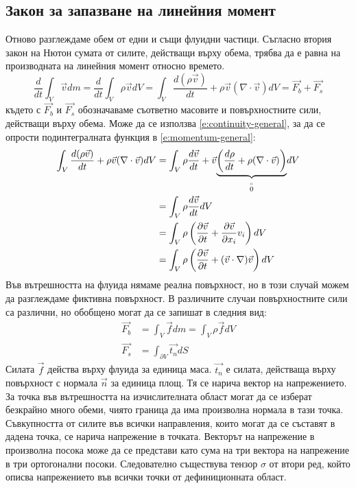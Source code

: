 \documentclass[12pt]{article}
\numberwithin{equation}{section}
\newcommand{\vel}{\vec{v}}
\newcommand{\DefineAs}[2]{\underset{\overset{\shortparallel}{#2}}{\underbrace{#1}}}
\begin{document}
\subsection{Закон за запазване на линейния момент}
Отново разглеждаме обем от едни и същи флуидни частици. Съгласно втория закон на Нютон сумата от силите, действащи върху обема, трябва да е равна на производната на линейния момент относно времето.
\begin{equation}
    \label{e:momentum-general}
    \frac{d}{dt}\int_V \vel dm=\frac{d}{dt}\int_V \rho\vel dV=\int_V \frac{d(\rho\vel)}{dt} + \rho\vel(\nabla\cdot\vel)dV=\vec{F_b}+\vec{F_s}
\end{equation}
където с $\vec{F_b}$ и $\vec{F_s}$ обозначаваме съответно масовите и повърхностните сили, действащи върху обема. Може да се използва \autoref{e:continuity-general}, за да се опрости подинтегралната функция в \autoref{e:momentum-general}:
\begin{equation}
    \begin{aligned}
        \int_V \frac{d(\rho\vel)}{dt} + \rho\vel(\nabla\cdot\vel)dV&=\int_V \rho\frac{d\vel}{dt}+\vel\DefineAs{\left(\frac{d\rho}{dt}+ \rho(\nabla\cdot\vel)\right)}{0} dV \\
        &=\int_V \rho\frac{d\vel}{dt}dV \\
        &=\int_V \rho\left(\frac{\partial \vel}{\partial t} + \frac{\partial \vel}{\partial x_i}v_i\right)dV  \\
        &=\int_V \rho\left(\frac{\partial \vel}{\partial t} + (\vel\cdot\nabla)\vel\right)dV
    \end{aligned}
\end{equation}
Във вътрешността на флуида нямаме реална повърхност, но в този случай можем да разглеждаме фиктивна повърхност. В различните случаи повърхностните сили са различни, но обобщено могат да се запишат в следния вид:
\begin{equation}
    \label{e:total-forces}
    \begin{aligned}
        \vec{F_b} &= \int_V \vec{f}dm = \int_V \rho\vec{f}dV \\
        \vec{F_s} &= \int_{\partial V} \vec{t_n}dS
    \end{aligned}
\end{equation}
Силата $\vec{f}$ действа върху флуида за единица маса. $\vec{t_n}$ е силата, действаща върху повърхност с нормала $\vec{n}$ за единица площ. Тя се нарича вектор на напрежението. За точка във вътрешността на изчислителната област могат да се изберат безкрайно много обеми, чиято граница да има произволна нормала в тази точка. Съвкупността от силите във всички направления, които могат да се съставят в дадена точка, се нарича напрежение в точката. Векторът на напрежение в произволна посока може да се представи като сума на три вектора на напрежение в три ортогонални посоки\cite{stress-tensor-existence}. Следователно съществува тензор $\sigma$ от втори ред, който описва напрежението във всички точки от дефиниционната област.
\end{document}
